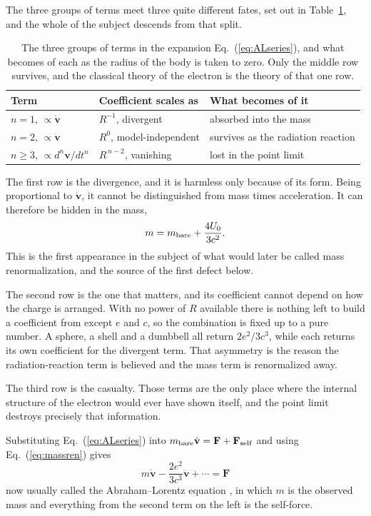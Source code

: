 \documentclass[preprint]{aastex701}
\begin{document}
The three groups of terms meet three quite different fates, set out in
Table~\ref{tab:terms}, and the whole of the subject descends from that split.

\begin{table}[htb]
\centering
\begin{tabular}{lll}
\toprule
Term & Coefficient scales as & What becomes of it \\
\midrule
$n=1$, $\propto\dot{\mathbf v}$
  & $R^{-1}$, divergent
  & absorbed into the mass \\
$n=2$, $\propto\ddot{\mathbf v}$
  & $R^{0}$, model-independent
  & survives as the radiation reaction \\
$n\ge3$, $\propto d^n\mathbf v/dt^n$
  & $R^{\,n-2}$, vanishing
  & lost in the point limit \\
\bottomrule
\end{tabular}
\caption{The three groups of terms in the expansion Eq.~(\ref{eq:ALseries}),
and what becomes of each as the radius of the body is taken to zero. Only the
middle row survives, and the classical theory of the electron is the theory of
that one row.
\label{tab:terms}}
\end{table}

The first row is the divergence, and it is harmless only because of its form.
Being proportional to $\dot{\mathbf v}$, it cannot be distinguished from mass
times acceleration. It can therefore be hidden in the mass,
\begin{equation}
m = m_{\rm bare} + \frac{4U_0}{3c^2}.
\label{eq:massren}
\end{equation}
This is the first appearance in the subject of what would later be called mass
renormalization, and the source of the first defect below.

The second row is the one that matters, and its coefficient cannot depend on how
the charge is arranged. With no power of $R$ available there is nothing left to
build a coefficient from except $e$ and $c$, so the combination is fixed up to a
pure number. A sphere, a shell and a dumbbell all return $2e^2/3c^3$, while each
returns its own coefficient for the divergent term. That asymmetry is the reason
the radiation-reaction term is believed and the mass term is renormalized away.

The third row is the casualty. Those terms are the only place where the internal
structure of the electron would ever have shown itself, and the point limit
destroys precisely that information.

Substituting Eq.~(\ref{eq:ALseries}) into
$m_{\rm bare}\dot{\mathbf v} = \mathbf F + \mathbf F_{\rm self}$ and using
Eq.~(\ref{eq:massren}) gives
\begin{equation}
\boxed{\;m\dot{\mathbf v} - \frac{2e^2}{3c^3}\ddot{\mathbf v} + \cdots
= \mathbf F\;}
\tag{AL}
\label{eq:AL}
\end{equation}
now usually called the Abraham--Lorentz equation \citep{abraham1905,lorentz1909},
in which $m$ is the observed
mass and everything from the second term on the left is the self-force.
\end{document}
